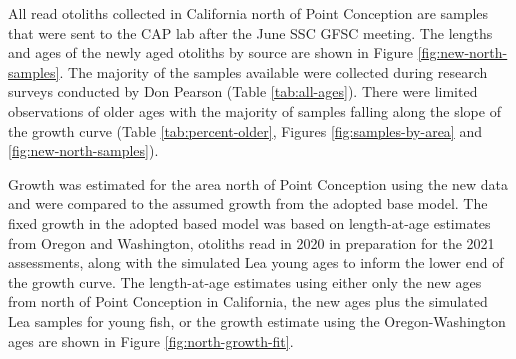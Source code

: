 \documentclass[11pt,
  english,
  a4paper,
]{article}
\begin{document}
All read otoliths collected in California north of Point Conception are samples that were sent to the CAP lab after the June SSC GFSC meeting. The lengths and ages of the newly aged otoliths by source are shown in Figure \ref{fig:new-north-samples}. The majority of the samples available were collected during research surveys conducted by Don Pearson (Table \ref{tab:all-ages}). There were limited observations of older ages with the majority of samples falling along the slope of the growth curve (Table \ref{tab:percent-older}, Figures \ref{fig:samples-by-area} and \ref{fig:new-north-samples}).

\leavevmode\tagmcend\tagstructend\par


Growth was estimated for the area north of Point Conception using the new data and were compared to the assumed growth from the adopted base model. The fixed growth in the adopted based model was based on length-at-age estimates from Oregon and Washington, otoliths read in 2020 in preparation for the 2021 assessments, along with the simulated Lea young ages to inform the lower end of the growth curve. The length-at-age estimates using either only the new ages from north of Point Conception in California, the new ages plus the simulated Lea samples for young fish, or the growth estimate using the Oregon-Washington ages are shown in Figure \ref{fig:north-growth-fit}.

\leavevmode\tagmcend\tagstructend\par

\end{document}
